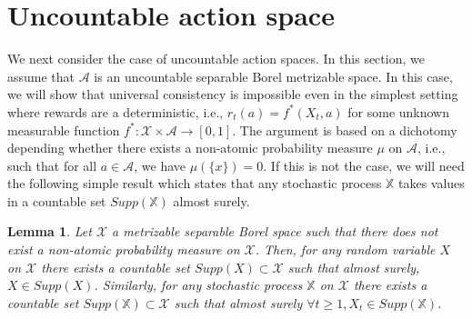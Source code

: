 \documentclass[aos]{imsart}
\theoremstyle{plain}
\newtheorem{lemma}[theorem]{Lemma}
\theoremstyle{remark}
\newcommand{\Acal}{\mathcal{A}}
\newcommand{\Xcal}{\mathcal{X}}
\newcommand{\Xbb}{\mathbb{X}}
\newcommand{\1}{\mathbbm{1}}%
\begin{document}
\section{Uncountable action space}
\label{sec:uncountable_actions}

We next consider the case of uncountable action spaces. In this section, we assume that $\Acal$ is an uncountable separable Borel metrizable space. In this case, we will show that universal consistency is impossible even in the simplest setting where rewards are a deterministic, i.e., $r_t(a) = f^*(X_t,a)$ for some unknown measurable function $f^*:\Xcal\times\Acal\to [0,1]$. The argument is based on a dichotomy depending whether there exists a non-atomic probability measure $\mu$ on $\Acal$, i.e., such that for all $a\in\Acal$, we have $\mu(\{x\})=0$. If this is not the case, we will need the following simple result which states that any stochastic process $\Xbb$ takes values in a countable set $Supp(\Xbb)$ almost surely.


\begin{lemma}
\label{lemma:supports}
Let $\Xcal$ a metrizable separable Borel space such that there does not exist a non-atomic probability measure on $\Xcal$. Then, for any random variable $X$ on $\Xcal$ there exists a countable set $Supp(X)\subset \Xcal$ such that almost surely, $X\in Supp(X)$. Similarly, for any stochastic process $\Xbb$ on $\Xcal$ there exists a countable set $Supp(\Xbb)\subset \Xcal$ such that almost surely $\forall t\geq 1, X_t\in Supp(\Xbb)$.
\end{lemma}
\end{document}
